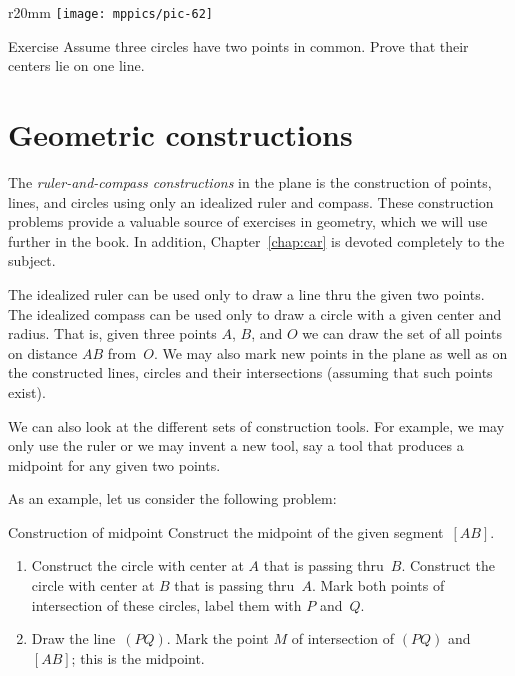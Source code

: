 {

\begin{wrapfigure}{r}{20mm}
\vskip-8mm
\centering
\texttt{[image: mppics/pic-62]}
\end{wrapfigure}

\begin{thm}{Exercise}\label{ex:tangent-circles-3}
Assume three circles have two points in common.
Prove that their centers lie on one line.
\end{thm}

}

\section*{Geometric constructions}

The \emph{ruler-and-compass constructions} in the plane is the construction of points, lines, and circles using only an idealized ruler and compass.
These construction problems provide a valuable source of exercises in geometry, 
which we will use further in the book.
In addition, Chapter~\ref{chap:car} is devoted completely to the subject.

The idealized ruler can be used only to draw a line thru the given two points.
The idealized compass can be used only to draw a circle with a given center and radius.
That is, given three points $A$, $B$, and $O$ 
we can draw the set of all points on distance $AB$ from~$O$.
We may also mark new points in the plane
as well as on the constructed lines, circles 
and their intersections (assuming that such points exist).

We can also look at the different sets of construction tools.
For example,
we may only use the ruler or
we may invent a new tool, 
say a tool that produces a midpoint for any given two points.

As an example, let us consider the following problem:

\begin{thm}{Construction of midpoint}
Construct the midpoint of the given segment~$[AB]$.
\end{thm}

\begin{enumerate}[1.]
\item Construct the circle 
with center at $A$ 
that is passing thru~$B$.
 Construct the circle 
with center at $B$ 
that is passing thru~$A$.
 Mark both points of intersection of these circles, label them with $P$ and~$Q$.
\item Draw the line~$(PQ)$.
Mark the point $M$ of intersection of $(PQ)$ and $[AB]$; this is the midpoint.
\end{enumerate}

